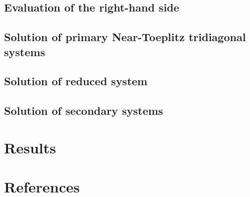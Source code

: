 \documentclass{elsarticle}
\begin{document}
\subsection{Evaluation of the right-hand side}

\subsection{Solution of primary Near-Toeplitz tridiagonal systems}

\subsection{Solution of reduced system}

\subsection{Solution of secondary systems}

\section{Results}

\section*{References}



\end{document}
